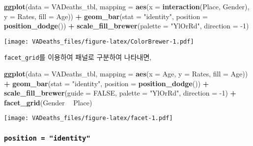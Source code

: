 \documentclass[
]{article}
\newenvironment{Shaded}{\begin{snugshade}}{\end{snugshade}}
\newcommand{\DataTypeTok}[1]{\textcolor[rgb]{0.13,0.29,0.53}{#1}}
\newcommand{\DecValTok}[1]{\textcolor[rgb]{0.00,0.00,0.81}{#1}}
\newcommand{\KeywordTok}[1]{\textcolor[rgb]{0.13,0.29,0.53}{\textbf{#1}}}
\newcommand{\NormalTok}[1]{#1}
\newcommand{\OperatorTok}[1]{\textcolor[rgb]{0.81,0.36,0.00}{\textbf{#1}}}
\newcommand{\OtherTok}[1]{\textcolor[rgb]{0.56,0.35,0.01}{#1}}
\newcommand{\StringTok}[1]{\textcolor[rgb]{0.31,0.60,0.02}{#1}}
\begin{document}
\begin{Shaded}
\begin{Highlighting}[]
\KeywordTok{ggplot}\NormalTok{(}\DataTypeTok{data =}\NormalTok{ VADeaths_tbl,}
              \DataTypeTok{mapping =} \KeywordTok{aes}\NormalTok{(}\DataTypeTok{x =} \KeywordTok{interaction}\NormalTok{(Place, Gender), }
                            \DataTypeTok{y =}\NormalTok{ Rates, }
                            \DataTypeTok{fill =}\NormalTok{ Age)) }\OperatorTok{+}
\KeywordTok{geom_bar}\NormalTok{(}\DataTypeTok{stat =} \StringTok{"identity"}\NormalTok{, }
         \DataTypeTok{position =} \KeywordTok{position_dodge}\NormalTok{()) }\OperatorTok{+}
\KeywordTok{scale_fill_brewer}\NormalTok{(}\DataTypeTok{palette =} \StringTok{"YlOrRd"}\NormalTok{, }
                  \DataTypeTok{direction =} \DecValTok{-1}\NormalTok{)}
\end{Highlighting}
\end{Shaded}

\texttt{[image: VADeaths\_files/figure-latex/ColorBrewer-1.pdf]}

\texttt{facet\_grid}를 이용하여 패널로 구분하여 나타내면,

\begin{Shaded}
\begin{Highlighting}[]
\KeywordTok{ggplot}\NormalTok{(}\DataTypeTok{data =}\NormalTok{ VADeaths_tbl,}
              \DataTypeTok{mapping =} \KeywordTok{aes}\NormalTok{(}\DataTypeTok{x =}\NormalTok{ Age, }
                            \DataTypeTok{y =}\NormalTok{ Rates, }
                            \DataTypeTok{fill =}\NormalTok{ Age)) }\OperatorTok{+}
\KeywordTok{geom_bar}\NormalTok{(}\DataTypeTok{stat =} \StringTok{"identity"}\NormalTok{, }
         \DataTypeTok{position =} \KeywordTok{position_dodge}\NormalTok{()) }\OperatorTok{+}\StringTok{ }
\KeywordTok{scale_fill_brewer}\NormalTok{(}\DataTypeTok{guide =} \OtherTok{FALSE}\NormalTok{,}
                  \DataTypeTok{palette =} \StringTok{"YlOrRd"}\NormalTok{, }
                  \DataTypeTok{direction =} \DecValTok{-1}\NormalTok{) }\OperatorTok{+}
\KeywordTok{facet_grid}\NormalTok{(Gender }\OperatorTok{~}\StringTok{ }\NormalTok{Place)}
\end{Highlighting}
\end{Shaded}

\texttt{[image: VADeaths\_files/figure-latex/facet-1.pdf]}

\hypertarget{position-identity}{%
\subsubsection{\texorpdfstring{\texttt{position\ =\ "identity"}}{position = "identity"}}\label{position-identity}}
\end{document}
